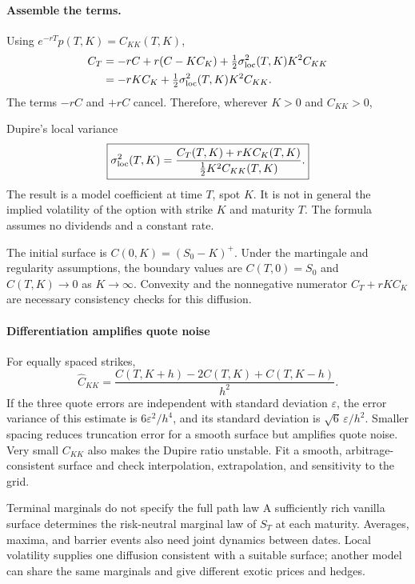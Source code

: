 \documentclass[10pt]{article}
\theoremstyle{definition}\newtheorem{definition}{Definition}[section]
\begin{document}
\paragraph{Assemble the terms.}
Using \(e^{-rT}p(T,K)=C_{KK}(T,K)\),
\begin{align*}
C_T
&=-rC+r(C-KC_K)+\tfrac12\sigma_{\rm loc}^2(T,K)K^2C_{KK}\\
&=-rKC_K+\tfrac12\sigma_{\rm loc}^2(T,K)K^2C_{KK}.
\end{align*}
The terms \(-rC\) and \(+rC\) cancel. Therefore, wherever \(K>0\) and
\(C_{KK}>0\),
\begin{keyidea}{Dupire's local variance}
\[
\boxed{\sigma_{\rm loc}^2(T,K)
=\frac{C_T(T,K)+rKC_K(T,K)}{\tfrac12K^2C_{KK}(T,K)}.}
\]
The result is a model coefficient at time \(T\), spot \(K\). It is not
in general the implied volatility of the option with strike \(K\) and
maturity \(T\). The formula assumes no dividends and a constant rate.
\end{keyidea}
The initial surface is \(C(0,K)=(S_0-K)^+\). Under the martingale and
regularity assumptions, the boundary values are \(C(T,0)=S_0\) and
\(C(T,K)\to0\) as \(K\to\infty\). Convexity and the nonnegative numerator
\(C_T+rKC_K\) are necessary consistency checks for this diffusion.



\paragraph{Differentiation amplifies quote noise}
For equally spaced strikes,
\[
\widehat C_{KK}=\frac{C(T,K+h)-2C(T,K)+C(T,K-h)}{h^2}.
\]
If the three quote errors are independent with standard deviation
\(\varepsilon\), the error variance of this estimate is
\(6\varepsilon^2/h^4\), and its standard deviation is
\(\sqrt6\,\varepsilon/h^2\). Smaller spacing reduces truncation error for a
smooth surface but amplifies quote noise. Very small \(C_{KK}\) also makes
the Dupire ratio unstable. Fit a smooth, arbitrage-consistent surface and
check interpolation, extrapolation, and sensitivity to the grid.

\begin{keyidea}{Terminal marginals do not specify the full path law}
A sufficiently rich vanilla surface determines the risk-neutral marginal
law of \(S_T\) at each maturity. Averages, maxima, and barrier events also
need joint dynamics between dates. Local volatility supplies one diffusion
consistent with a suitable surface; another model can share the same
marginals and give different exotic prices and hedges.
\end{keyidea}
\end{document}
